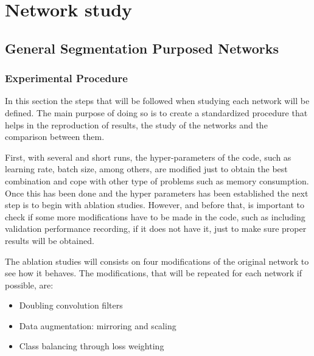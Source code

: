 
\chapter{Network study} %

\label{Chapter2} %




\section{General Segmentation Purposed Networks}

\subsection{Experimental Procedure}\label{method}

In this section the steps that will be followed when studying each network will be defined. The main purpose of doing so is to create a standardized procedure that helps in the reproduction of results, the study of the networks and the comparison between them. \newline

First, with several and short runs, the hyper-parameters of the code, such as learning rate, batch size, among others, are modified just to obtain the best combination and cope with other type of problems such as memory consumption. Once this has been done and the hyper parameters has been established the next step is to begin with ablation studies. However, and before that, is important to check if some more modifications have to be made in the code, such as including validation performance recording, if it does not have it, just to make sure proper results will be obtained.\newline

The ablation studies will consists on four modifications of the original network to see how it behaves. The modifications, that will be repeated for each network if possible, are:

\begin{itemize}
\item Doubling convolution filters
\item Data augmentation: mirroring and scaling
\item Class balancing through loss weighting
\end{itemize}

